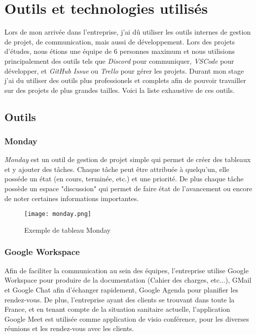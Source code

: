 \section{Outils et technologies utilisés}


Lors de mon arrivée dans l'entreprise, j'ai dû utiliser les outils internes de gestion de projet, de communication, mais aussi de développement. Lors des projets d'études, nous étions une équipe de 6 personnes maximum et nous utilisions principalement des outils tels que \textit{Discord}\cite{discord} pour communiquer, \textit{VSCode}\cite{vscode} pour développer, et \textit{GitHub Issue}\cite{github} ou \textit{Trello}\cite{trello} pour gérer les projets. Durant mon stage j'ai du utiliser des outils plus professionels et complets afin de pouvoir travailler sur des projets de plus grandes tailles. Voici la liste exhaustive de ces outils. 
\subsection{Outils}

\subsubsection{Monday}

\textit{Monday}\cite{monday} est un outil de gestion de projet simple qui permet de créer des tableaux et y ajouter des tâches.
Chaque tâche peut être attribuée à quelqu'un, elle posséde un état (en cours, terminée, etc.) et une priorité.
De plus chaque tâche possède un espace "discussion" qui permet de faire état de l'avancement ou encore de noter certaines informations importantes. 

\begin{figure}[htbp]
    \center
    \texttt{[image: monday.png]}
    \caption{Exemple de tableau Monday}
\end{figure}

\subsubsection{Google Workspace}
Afin de faciliter la communication au sein des équipes, l'entreprise utilise Google Workspace pour produire de la documentation (Cahier des charges, etc...), GMail et Google Chat afin d'échanger rapidement, Google Agenda pour planifier les rendez-vous.
De plus, l'entreprise ayant des clients se trouvant dans toute la France, et en tenant compte de la situation sanitaire actuelle, l'application Google Meet est utilisée comme application de visio conférence, pour les diverses réunions et les rendez-vous avec les clients. 

